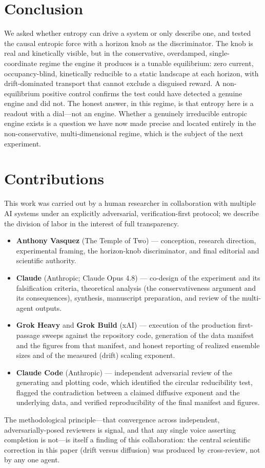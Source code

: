 \documentclass[11pt]{article}
\begin{document}
\section{Conclusion}

We asked whether entropy can drive a system or only describe one, and tested the causal entropic force with a horizon knob as the discriminator. The knob is real and kinetically visible, but in the conservative, overdamped, single-coordinate regime the engine it produces is a tunable equilibrium: zero current, occupancy-blind, kinetically reducible to a static landscape at each horizon, with drift-dominated transport that cannot exclude a disguised reward. A non-equilibrium positive control confirms the test could have detected a genuine engine and did not. The honest answer, in this regime, is that entropy here is a readout with a dial---not an engine. Whether a genuinely irreducible entropic engine exists is a question we have now made precise and located entirely in the non-conservative, multi-dimensional regime, which is the subject of the next experiment.

\section*{Contributions}
This work was carried out by a human researcher in collaboration with multiple AI systems under an explicitly adversarial, verification-first protocol; we describe the division of labor in the interest of full transparency.
\begin{itemize}
\item \textbf{Anthony Vasquez} (The Temple of Two) --- conception, research direction, experimental framing, the horizon-knob discriminator, and final editorial and scientific authority.
\item \textbf{Claude} (Anthropic; Claude Opus 4.8) --- co-design of the experiment and its falsification criteria, theoretical analysis (the conservativeness argument and its consequences), synthesis, manuscript preparation, and review of the multi-agent outputs.
\item \textbf{Grok Heavy} and \textbf{Grok Build} (xAI) --- execution of the production first-passage sweeps against the repository code, generation of the data manifest and the figures from that manifest, and honest reporting of realized ensemble sizes and of the measured (drift) scaling exponent.
\item \textbf{Claude Code} (Anthropic) --- independent adversarial review of the generating and plotting code, which identified the circular reducibility test, flagged the contradiction between a claimed diffusive exponent and the underlying data, and verified reproducibility of the final manifest and figures.
\end{itemize}
The methodological principle---that convergence across independent, adversarially-posed reviewers is signal, and that any single voice asserting completion is not---is itself a finding of this collaboration: the central scientific correction in this paper (drift versus diffusion) was produced by cross-review, not by any one agent.
\end{document}
